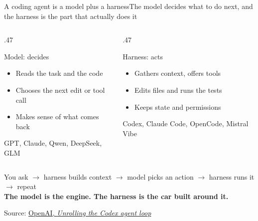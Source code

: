 \documentclass[aspectratio=169]{beamer}
\newcommand{\src}[2]{\par\vfill{\fontsize{7}{8}\selectfont\color{ACINgray}Source: \href{#1}{#2}}}
\begin{document}
\begin{frame}{A coding agent is a model plus a harness}{The model decides what to do next, and the harness is the part that actually does it}
\begin{columns}[T,onlytextwidth]
\begin{column}{.47\textwidth}
  \begin{block}{Model: decides}
  \begin{itemize}\itemsep4pt
    \item Reads the task and the code
    \item Chooses the next edit or tool call
    \item Makes sense of what comes back
  \end{itemize}
  \end{block}
  \centering\footnotesize GPT, Claude, Qwen, DeepSeek, GLM
\end{column}
\hfill
\begin{column}{.47\textwidth}
  \begin{exampleblock}{Harness: acts}
  \begin{itemize}\itemsep4pt
    \item Gathers context, offers tools
    \item Edits files and runs the tests
    \item Keeps state and permissions
  \end{itemize}
  \end{exampleblock}
  \centering\footnotesize Codex, Claude Code, OpenCode, Mistral Vibe
\end{column}
\end{columns}
\vspace{4mm}
\centering
{\small You ask $\rightarrow$ harness builds context $\rightarrow$ model picks an action $\rightarrow$ harness runs it $\rightarrow$ repeat}\\[2mm]
\textbf{The model is the engine. The harness is the car built around it.}
\src{https://openai.com/index/unrolling-the-codex-agent-loop/}{OpenAI, \emph{Unrolling the Codex agent loop}}
\end{frame}
\end{document}
